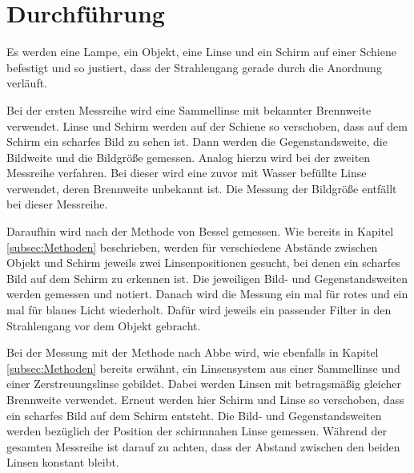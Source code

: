 \section{Durchführung}
\label{sec:Durchführung}

Es werden eine Lampe, ein Objekt, eine Linse und ein Schirm auf
einer Schiene befestigt und so justiert, dass der Strahlengang gerade durch die Anordnung
verläuft.

Bei der ersten Messreihe wird eine Sammellinse mit bekannter Brennweite verwendet.
Linse und Schirm werden auf der Schiene so verschoben, dass auf dem Schirm ein
scharfes Bild zu sehen ist. Dann werden die Gegenstandsweite, die Bildweite und
die Bildgröße gemessen. Analog hierzu wird bei der zweiten Messreihe verfahren.
Bei dieser wird eine zuvor mit Wasser befüllte Linse verwendet, deren Brennweite
unbekannt ist. Die Messung der Bildgröße entfällt bei dieser Messreihe.

Daraufhin wird nach der Methode von Bessel gemessen. Wie bereits
in Kapitel \ref{subsec:Methoden} beschrieben, werden für verschiedene Abstände zwischen
Objekt und Schirm jeweils zwei Linsenpositionen gesucht, bei denen ein scharfes Bild
auf dem Schirm zu erkennen ist. Die jeweiligen Bild- und Gegenstandsweiten werden
gemessen und notiert.
Danach wird die Messung ein mal für rotes und ein mal für blaues Licht wiederholt.
Dafür wird jeweils ein passender Filter in den Strahlengang vor dem Objekt gebracht.

Bei der Messung mit der Methode nach Abbe wird, wie ebenfalls in Kapitel \ref{subsec:Methoden}
bereits erwähnt, ein Linsensystem aus einer Sammellinse und einer Zerstreuungslinse
gebildet. Dabei werden Linsen mit betragsmäßig gleicher Brennweite verwendet.
Erneut werden hier Schirm und Linse so verschoben, dass ein scharfes Bild auf
dem Schirm entsteht. Die Bild- und Gegenstandsweiten werden bezüglich der Position
der schirmnahen Linse gemessen. Während der gesamten Messreihe ist darauf zu achten,
dass der Abstand zwischen den beiden Linsen konstant bleibt.
